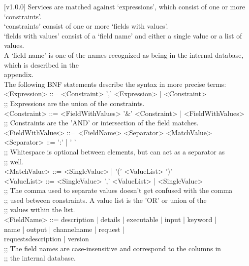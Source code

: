 [v1.0.0]
%
Services are matched against `expressions', which consist of one or more
`constraints'.\\
`constraints' consist of one or more `fields with values'.\\
`fields with values' consist of a `field name' and either a single value or a list of
values.\\
A `field name' is one of the names recognized as being in the internal database, which is
described in the\\
 appendix.\\

The following BNF statements describe the syntax in more precise terms:
\outputBegin{}
<Expression> ::= <Constraint> ',' <Expression> | <Constraint>\\
;; Expressions are the union of the constraints.\\

<Constraint> ::= <FieldWithValues> '\&' <Constraint> | <FieldWithValues>\\
;; Constraints are the 'AND' or intersection of the field matches.\\

<FieldWithValues> ::= <FieldName> <Separator> <MatchValue>\\
<Separator> ::= ':' | ' '\\
;; Whitespace is optional between elements, but can act as a separator as\\
;; well.\\

<MatchValue> ::= <SingleValue> | '(' <ValueList> ')'\\
<ValueList> ::= <SingleValue> ',' <ValueList> | <SingleValue>\\
;; The comma used to separate values doesn't get confused with the comma\\
;; used between constraints. A value list is the 'OR' or union of the\\
;; values within the list.\\

\settowidth{\utilLen}{<FieldName> ::= }%
<FieldName> ::= description | details | executable | input | keyword |\\
\hspace*{\utilLen}name | output | channelname | request |\\
\hspace*{\utilLen}requestsdescription | version\\
;; The field names are case-insensitive and correspond to the columns in\\
;; the internal database.\\

